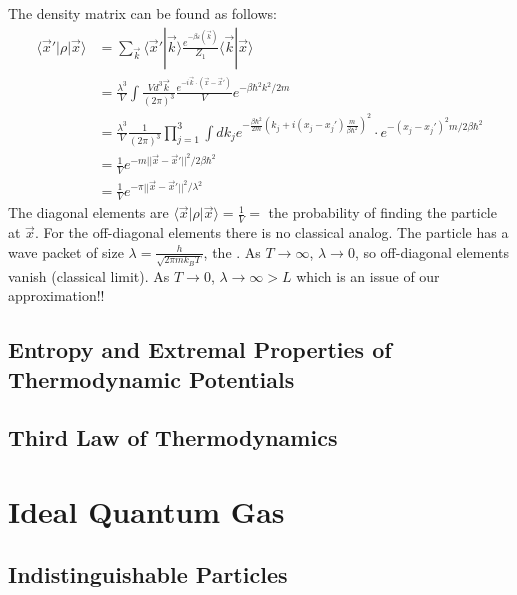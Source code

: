 \documentclass[12pt, a4paper, oneside, openright, titlepage]{book}
\begin{document}
The density matrix can be found as follows: \begin{align*}
    \langle \vec{x}'|\rho|\vec{x}\rangle &= \sum_{\vec{k}}\langle \vec{x}'|\vec{k}\rangle \frac{e^{-\beta\varepsilon(\vec{k})}}{Z_1}\langle \vec{k}|\vec{x}\rangle \\
    &= \frac{\lambda^3}{V}\int\frac{Vd^3\vec{k}}{(2\pi)^3}\frac{e^{-i\vec{k}\cdot(\vec{x}-\vec{x}')}}{V}e^{-\beta\hbar^2k^2/2m} \\
    &= \frac{\lambda^3}{V}\frac{1}{(2\pi)^3}\prod_{j=1}^3\int dk_je^{-\frac{\beta\hbar^2}{2m}\left(k_j+i(x_j-x_j')\frac{m}{\beta\hbar^2}\right)^2} \cdot e^{-(x_j-x_j')^2m/2\beta\hbar^2} \\
    &= \frac{1}{V}e^{-m||\vec{x}-\vec{x}'||^2/2\beta\hbar^2} \\
    &= \frac{1}{V}e^{-\pi||\vec{x}-\vec{x}'||^2/\lambda^2}
\end{align*}
The diagonal elements are $\langle \vec{x}|\rho|\vec{x}\rangle = \frac{1}{V} = $ the probability of finding the particle at $\vec{x}$. For the off-diagonal elements there is no classical analog. The particle has a wave packet of size $\lambda = \frac{h}{\sqrt{2\pi mk_BT}}$, the . As $T\rightarrow \infty$, $\lambda\rightarrow 0$, so off-diagonal elements vanish (classical limit). As $T\rightarrow 0$, $\lambda \rightarrow \infty > L$ which is an issue of our approximation!!




\section{Entropy and Extremal Properties of Thermodynamic Potentials}



\section{Third Law of Thermodynamics}






\chapter{Ideal Quantum Gas}

\section{Indistinguishable Particles}
\end{document}
